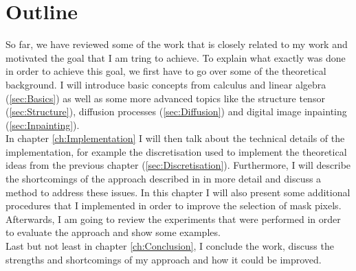 \section{Outline}
So far, we have reviewed some of the work that is closely related to my work and 
motivated the goal that I am tring to achieve.
To explain what exactly was done in order to achieve this goal, we first have to go over some of the
theoretical background. I will introduce basic concepts from
calculus and linear algebra (\ref{sec:Basics}) as well as some more advanced topics
like the structure tensor (\ref{sec:Structure}), diffusion processes (\ref{sec:Diffusion}) and
digital image inpainting (\ref{sec:Inpainting}).\\
In chapter \ref{ch:Implementation} I will then talk about the technical details of the  
implementation, for example the discretisation used to implement the theoretical ideas from 
the previous chapter (\ref{sec:Discretisation}). 
Furthermore, I will describe the shortcomings of the approach described in \cite{zimmer07} in more
detail and discuss a method to address these issues. In this chapter I will also present some
additional procedures that I implemented in order to improve the selection of mask pixels. \\
Afterwards, I am going to review the experiments that were performed in order to evaluate the
approach and show some examples.\\
Last but not least in chapter \ref{ch:Conclusion}, I conclude the work, discuss the strengths
and shortcomings of my approach and how it could be improved.
